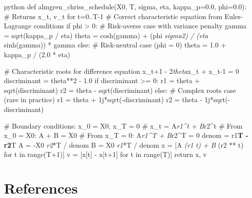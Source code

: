 \documentclass[11pt,a4paper]{article}
\begin{document}
python
def almgren\_chriss\_schedule(X0, T, sigma, eta, kappa\_p=0.0, phi=0.0):
    \# Returns x\_t, v\_t for t=0..T-1
    \# Correct characteristic equation from Euler-Lagrange conditions
    if phi > 0:
        \# Risk-averse case with variance penalty
        gamma = sqrt(kappa\_p / eta)  
        theta = cosh(gamma) + (phi \textit{ sigma}\textit{2) / (eta } sinh(gamma)) * gamma
    else:
        \# Risk-neutral case (phi = 0)
        theta = 1.0 + kappa\_p / (2.0 * eta)
    
    \# Characteristic roots for difference equation x\_{t+1} - 2\textit{theta}x\_t + x\_{t-1} = 0
    discriminant = theta**2 - 1.0
    if discriminant >= 0:
        r1 = theta + sqrt(discriminant) 
        r2 = theta - sqrt(discriminant)
    else:
        \# Complex roots case (rare in practice)
        r1 = theta + 1j*sqrt(-discriminant)
        r2 = theta - 1j*sqrt(-discriminant)
    
    \# Boundary conditions: x\_0 = X0, x\_T = 0
    \# x\_t = A\textit{r1^t + B}r2^t
    \# From x\_0 = X0: A + B = X0
    \# From x\_T = 0:  A\textit{r1^T + B}r2^T = 0
    denom = r1\textbf{T - r2}T
    A = -X0 \textit{ r2}*T / denom
    B = X0 \textit{ r1}*T / denom
    x = [A \textit{ (r1 }\textit{ t) + B } (r2 ** t) for t in range(T+1)]
    v = [x[t] - x[t+1] for t in range(T)]
    return x, v



\section{References}

\end{document}
